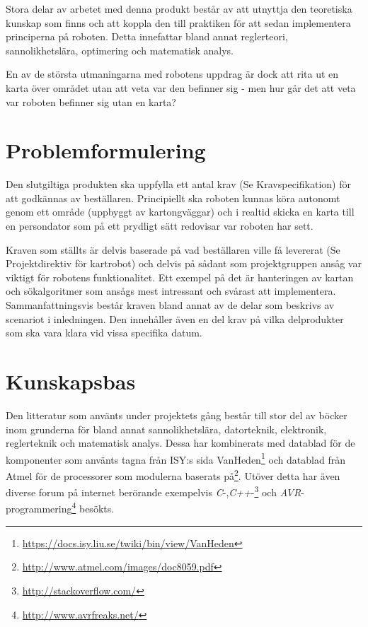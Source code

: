 ﻿\documentclass[a4paper,12pt,fleqn]{article}
\begin{document}
Stora delar av arbetet med denna produkt består av att utnyttja den teoretiska kunskap som finns och att koppla den till praktiken för att sedan implementera principerna på roboten. 
Detta innefattar bland annat reglerteori, sannolikhetslära, optimering och matematisk analys.

En av de största utmaningarna med robotens uppdrag är dock att rita ut en karta över området utan att veta var den befinner sig - men hur går det att veta var roboten befinner sig utan en karta? 

\section{Problemformulering}

Den slutgiltiga produkten ska uppfylla ett antal krav (Se Kravspecifikation) för att godkännas av beställaren. Principiellt ska roboten kunnas köra autonomt genom ett område (uppbyggt av kartongväggar) och i realtid skicka en karta till en persondator som på ett prydligt sätt redovisar var roboten har sett. 

Kraven som ställts är delvis baserade på vad beställaren ville få levererat (Se Projektdirektiv för kartrobot) och delvis på sådant som projektgruppen ansåg var viktigt för robotens funktionalitet. Ett exempel på det är hanteringen av kartan och sökalgoritmer som ansågs mest intressant och svårast att implementera. 
Sammanfattningsvis består kraven bland annat av de delar som beskrivs av scenariot i inledningen. Den innehåller även en del krav på vilka delprodukter som ska vara klara vid vissa specifika datum.

\section{Kunskapsbas}

Den litteratur som använts under projektets gång består till stor del av böcker inom grunderna för bland annat sannolikhetslära, datorteknik, elektronik, reglerteknik och matematisk analys. 
Dessa har kombinerats med datablad för de komponenter som använts tagna från ISY:s sida VanHeden\footnote{\url{https://docs.isy.liu.se/twiki/bin/view/VanHeden}} och datablad från Atmel för 
de processorer som modulerna baserats på\footnote{\url{http://www.atmel.com/images/doc8059.pdf}}. 
Utöver detta har även diverse forum på internet berörande exempelvis \emph{C}-,\emph{C++}-\footnote{\url{http://stackoverflow.com/}} och \emph{AVR}-programmering\footnote{\url{http://www.avrfreaks.net/}} besökts.
\end{document}
